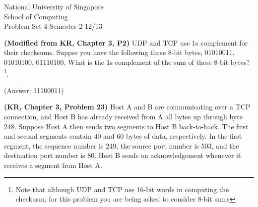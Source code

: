 \documentclass[a4paper,11pt]{exam}
\begin{document}
    \extraheadheight{.5in}
    {\large\sf National University of Singapore\\ School of Computing \\
    \LARGE\sf Problem Set 4}%
    {\large\sf Semester 2 12/13}
    \firstpageheadrule
    \pagestyle{headandfoot}

    \begin{questions}
\question 
\textbf{(Modified from KR, Chapter 3, P2)} 
UDP and TCP use 1s complement for their checksums.  Suppse you have the following three 8-bit bytes, 01010011, 01010100, 01110100.  What is the 1s complement of the sum of these 8-bit bytes?  \footnote{Note that although UDP and TCP use 16-bit words in computing the checkusm, for this problem you are being asked to consider 8-bit sums}.  

(Answer: 11100011)

\question 
\textbf{(KR, Chapter 3, Problem 23)} 
Host A and B are communicating over a TCP connection, and Host B has already received from A all bytes up through byte 248.  Suppose Host A then sends two segments to Host B back-to-back.  The first and second segments contain 40 and 60 bytes of data, respectively.  In the first segment, the sequence number is 249, the source port number is 503, and the destination port number is 80.  Host B sends an acknowledgement whenever it receives a segment from Host A.

\end{questions}
\end{document}
